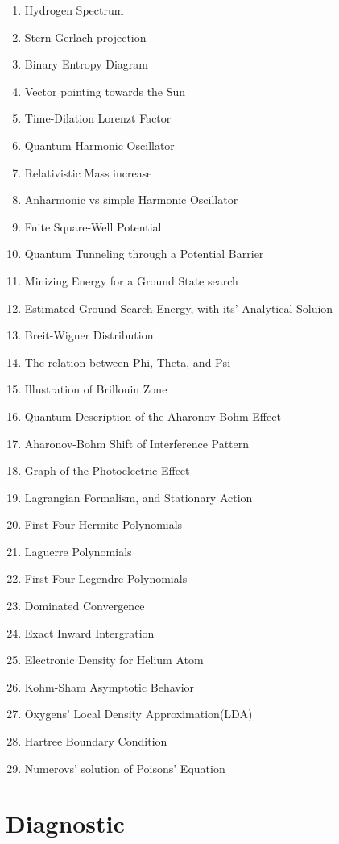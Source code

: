 \documentclass[a4paper, 10pt, onepage]{elegantbook}
\begin{document}
\begin{enumerate}

\item Hydrogen Spectrum
\item Stern-Gerlach projection
\item Binary Entropy Diagram
\item Vector pointing towards the Sun
\item Time-Dilation Lorenzt Factor
\item Quantum Harmonic Oscillator
\item Relativistic Mass increase
\item Anharmonic vs simple Harmonic Oscillator
\item Fnite Square-Well Potential
\item Quantum Tunneling through a Potential Barrier
\item Minizing Energy for a Ground State search
\item Estimated Ground Search Energy, with its' Analytical Soluion
\item Breit-Wigner Distribution
\item The relation between Phi, Theta, and Psi
\item Illustration of Brillouin Zone
\item Quantum Description of the Aharonov-Bohm Effect
\item Aharonov-Bohm Shift of Interference Pattern
\item Graph of the Photoelectric Effect
\item Lagrangian Formalism, and Stationary Action
\item First Four Hermite Polynomials
\item Laguerre Polynomials
\item First Four Legendre Polynomials
\item Dominated Convergence
\item Exact Inward Intergration
\item Electronic Density for Helium Atom
\item Kohm-Sham Asymptotic Behavior
\item Oxygens' Local Density Approximation(LDA)
\item Hartree Boundary Condition
\item Numerovs' solution of Poisons' Equation 

\end{enumerate}

\newpage

\section{Diagnostic}
\end{document}
